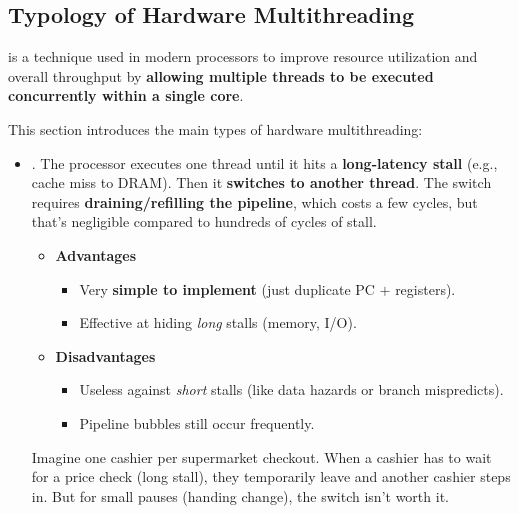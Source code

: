 \subsection{Typology of Hardware Multithreading}

 is a technique used in modern processors to improve resource utilization and overall throughput by \textbf{allowing multiple threads to be executed concurrently within a single core}.

\highspace
This section introduces the main types of hardware multithreading:
\begin{itemize}
    \item {}. The processor executes one thread until it hits a \textbf{long-latency stall} (e.g., cache miss to DRAM). Then it \textbf{switches to another thread}. The switch requires \textbf{draining/refilling the pipeline}, which costs a few cycles, but that's negligible compared to hundreds of cycles of stall.
    \begin{itemize}
        \item[\textcolor{Green3}{\faIcon{check-circle}}] \textcolor{Green3}{\textbf{Advantages}}
        \begin{itemize}
            \item[\textcolor{Green3}{\faIcon{check}}] Very \textbf{simple to implement} (just duplicate PC $+$ registers).
            \item[\textcolor{Green3}{\faIcon{check}}] Effective at hiding \emph{long} stalls (memory, I/O).
        \end{itemize}

        \item[\textcolor{Red2}{\faIcon{times-circle}}] \textcolor{Red2}{\textbf{Disadvantages}}
        \begin{itemize}
            \item[\textcolor{Red2}{\faIcon{times}}] Useless against \emph{short} stalls (like data hazards or branch mispredicts).
            \item[\textcolor{Red2}{\faIcon{times}}] Pipeline bubbles still occur frequently.
        \end{itemize}
    \end{itemize}

    \begin{examplebox}
        Imagine one cashier per supermarket checkout. When a cashier has to wait for a price check (long stall), they temporarily leave and another cashier steps in. But for small pauses (handing change), the switch isn't worth it.
    \end{examplebox}
    


\end{itemize}

